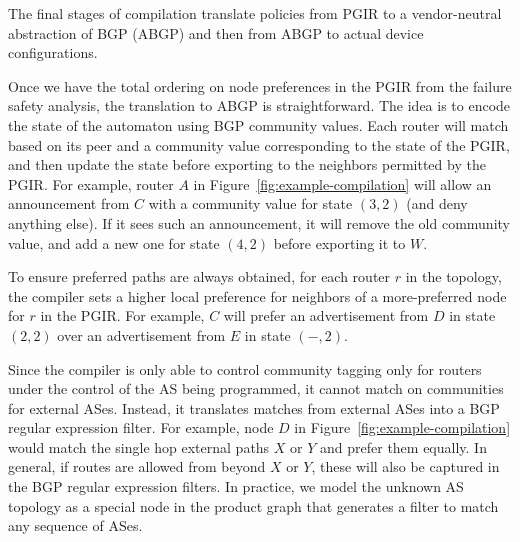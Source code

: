 
The final stages of compilation translate policies from PGIR to a  vendor-neutral abstraction of BGP (ABGP) and then from ABGP to actual device configurations.


Once we have the total ordering on node preferences in the PGIR from the failure safety analysis, the translation to ABGP is straightforward. The idea is to encode the state of the automaton using BGP community values. Each router will match based on its peer and a community value corresponding to the state of the PGIR, and then update the state before exporting to the neighbors permitted by the PGIR. For example, router $A$ in Figure~\ref{fig:example-compilation} will allow an announcement from $C$ with a community value for state $(3,2)$ (and deny anything else). If it sees such an announcement, it will remove the old community value, and add a new one for state $(4,2)$ before exporting it to $W$.

To ensure preferred paths are always obtained, for each router $r$ in the topology, the compiler sets a higher local preference for neighbors of a more-preferred node for $r$ in the PGIR. For example, $C$ will prefer an advertisement from $D$ in state $(2,2)$ over an advertisement from $E$ in state $(-,2)$.

Since the compiler is only able to control community tagging only for routers under the control of the AS being programmed, it cannot match on communities for external ASes. Instead, it translates matches from external ASes into a BGP regular expression filter. For example, node $D$ in Figure~\ref{fig:example-compilation} would match the single hop external paths $X$ or $Y$ and prefer them equally. In general, if routes are allowed from beyond $X$ or $Y$, these will also be captured in the BGP regular expression filters. In practice, we model the unknown AS topology as a special node in the product graph that generates a filter to match any sequence of ASes.

